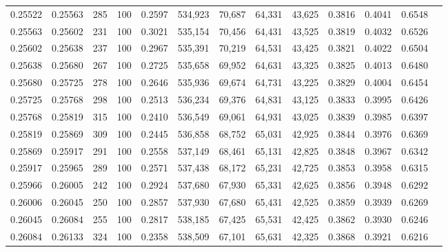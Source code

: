 \begin{tabular}{rrrrrrrrrrrrr}
0.25522 & 0.25563 &   285 & 100 &                                     0.2597 & 534,923 &  70,687 &  64,331 &  43,625 & 0.3816 & 0.4041 & 0.6548 \\
0.25563 & 0.25602 &   231 & 100 &                                     0.3021 & 535,154 &  70,456 &  64,431 &  43,525 & 0.3819 & 0.4032 & 0.6526 \\
0.25602 & 0.25638 &   237 & 100 &                                     0.2967 & 535,391 &  70,219 &  64,531 &  43,425 & 0.3821 & 0.4022 & 0.6504 \\
0.25638 & 0.25680 &   267 & 100 &                                     0.2725 & 535,658 &  69,952 &  64,631 &  43,325 & 0.3825 & 0.4013 & 0.6480 \\
0.25680 & 0.25725 &   278 & 100 &                                     0.2646 & 535,936 &  69,674 &  64,731 &  43,225 & 0.3829 & 0.4004 & 0.6454 \\
0.25725 & 0.25768 &   298 & 100 &                                     0.2513 & 536,234 &  69,376 &  64,831 &  43,125 & 0.3833 & 0.3995 & 0.6426 \\
0.25768 & 0.25819 &   315 & 100 &                                     0.2410 & 536,549 &  69,061 &  64,931 &  43,025 & 0.3839 & 0.3985 & 0.6397 \\
0.25819 & 0.25869 &   309 & 100 &                                     0.2445 & 536,858 &  68,752 &  65,031 &  42,925 & 0.3844 & 0.3976 & 0.6369 \\
0.25869 & 0.25917 &   291 & 100 &                                     0.2558 & 537,149 &  68,461 &  65,131 &  42,825 & 0.3848 & 0.3967 & 0.6342 \\
0.25917 & 0.25965 &   289 & 100 &                                     0.2571 & 537,438 &  68,172 &  65,231 &  42,725 & 0.3853 & 0.3958 & 0.6315 \\
0.25966 & 0.26005 &   242 & 100 &                                     0.2924 & 537,680 &  67,930 &  65,331 &  42,625 & 0.3856 & 0.3948 & 0.6292 \\
0.26006 & 0.26045 &   250 & 100 &                                     0.2857 & 537,930 &  67,680 &  65,431 &  42,525 & 0.3859 & 0.3939 & 0.6269 \\
0.26045 & 0.26084 &   255 & 100 &                                     0.2817 & 538,185 &  67,425 &  65,531 &  42,425 & 0.3862 & 0.3930 & 0.6246 \\
0.26084 & 0.26133 &   324 & 100 &                                     0.2358 & 538,509 &  67,101 &  65,631 &  42,325 & 0.3868 & 0.3921 & 0.6216 \\

\end{tabular}
